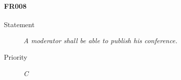\paragraph{FR008}
  \begin{description}
  \item [Statement] 
    \textit{ A \gls{moderator} shall be able to publish his \gls{conference}.}
  \item [Priority] \textit{C}
\end{description}